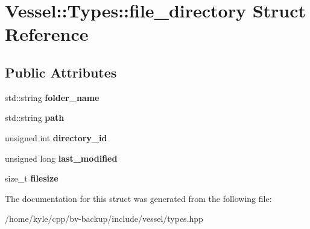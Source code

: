 \hypertarget{struct_vessel_1_1_types_1_1file__directory}{}\section{Vessel\+:\+:Types\+:\+:file\+\_\+directory Struct Reference}
\label{struct_vessel_1_1_types_1_1file__directory}
\subsection*{Public Attributes}
\begin{DoxyCompactItemize}
\item 
\mbox{\label{struct_vessel_1_1_types_1_1file__directory_a2b0d8994875f5e09536cfe986684aca0}} 
std\+::string {\bfseries folder\+\_\+name}
\item 
\mbox{\label{struct_vessel_1_1_types_1_1file__directory_abd82ff6f74b07186963817ee763ea9c7}} 
std\+::string {\bfseries path}
\item 
\mbox{\label{struct_vessel_1_1_types_1_1file__directory_a6502484d22e9568c3022e315360eb22e}} 
unsigned int {\bfseries directory\+\_\+id}
\item 
\mbox{\label{struct_vessel_1_1_types_1_1file__directory_aa480112ba8437fc695ce9847e7a4121c}} 
unsigned long {\bfseries last\+\_\+modified}
\item 
\mbox{\label{struct_vessel_1_1_types_1_1file__directory_aa7e79295711fca3acc231fd112b39a6e}} 
size\+\_\+t {\bfseries filesize}
\end{DoxyCompactItemize}


The documentation for this struct was generated from the following file\+:\begin{DoxyCompactItemize}
\item 
/home/kyle/cpp/bv-\/backup/include/vessel/types.\+hpp\end{DoxyCompactItemize}

